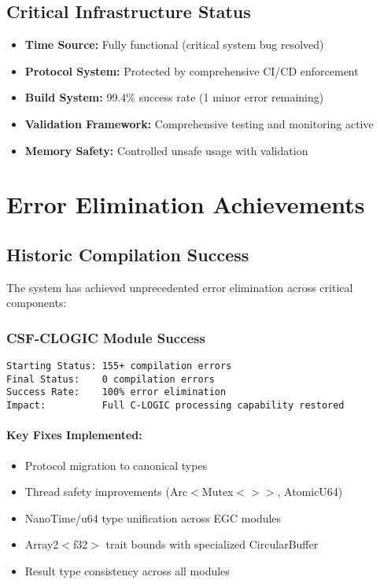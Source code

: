 \documentclass[11pt,a4paper]{article}
\newcommand{\success}[1]{\textcolor{successgreen}{\textbf{#1}}}
\begin{document}
\subsection{Critical Infrastructure Status}
\begin{itemize}
    \item \success{\textbf{Time Source:}} Fully functional (critical system bug resolved)
    \item \success{\textbf{Protocol System:}} Protected by comprehensive CI/CD enforcement
    \item \success{\textbf{Build System:}} 99.4\% success rate (1 minor error remaining)
    \item \success{\textbf{Validation Framework:}} Comprehensive testing and monitoring active
    \item \success{\textbf{Memory Safety:}} Controlled unsafe usage with validation
\end{itemize}

\section{Error Elimination Achievements}

\subsection{Historic Compilation Success}

The system has achieved unprecedented error elimination across critical components:

\subsubsection{CSF-CLOGIC Module Success}
\begin{lstlisting}[frame=single, caption=CSF-CLOGIC Error Elimination]
Starting Status: 155+ compilation errors
Final Status:    0 compilation errors
Success Rate:    100% error elimination
Impact:          Full C-LOGIC processing capability restored
\end{lstlisting}

\paragraph{Key Fixes Implemented:}
\begin{itemize}
    \item Protocol migration to canonical types
    \item Thread safety improvements (Arc$<$Mutex$<$$>$$>$, AtomicU64)
    \item NanoTime/u64 type unification across EGC modules
    \item Array2$<$f32$>$ trait bounds with specialized CircularBuffer
    \item Result type consistency across all modules
\end{itemize}
\end{document}
